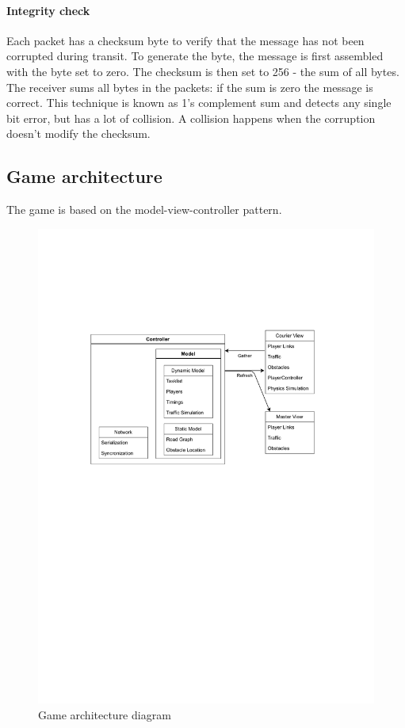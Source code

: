 \documentclass[12pt]{article}
\begin{document}
\paragraph{Integrity check}
Each packet has a checksum byte to verify that the message has not been corrupted during transit. To generate the byte, the message is first assembled with the byte set to zero. The checksum is then set to 256 - the sum of all bytes. The receiver sums all bytes in the packets: if the sum is zero the message is correct. This technique is known as 1's complement sum \cite{checksum} and detects any single bit error, but has a lot of collision. A collision happens when the corruption doesn't modify the checksum.

\clearpage

\subsection{Game architecture}
The game is based on the model-view-controller pattern. \cite{mvc}
\begin{figure}[H]
\includegraphics[width=\textwidth]{game architecture}
\caption{Game architecture diagram}
\label{fig:gamearch}
\end{figure}
\end{document}
